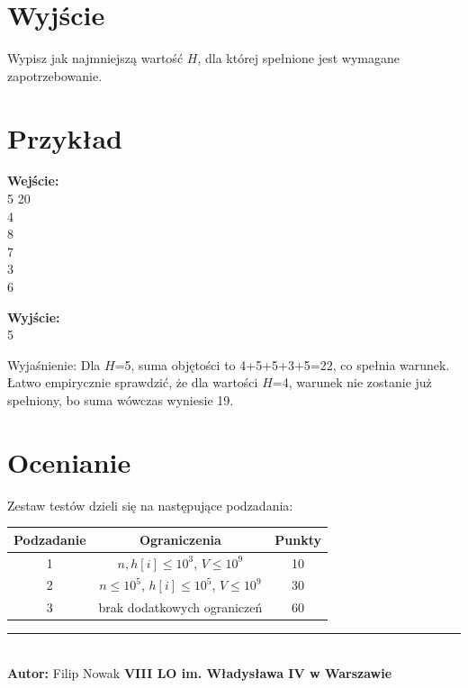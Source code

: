 \documentclass[a4paper,11pt]{article}
\newcommand{\tasktitle}{Dostawa Piwa}
\newcommand{\taskshort}{PIW}
\newcommand{\contestinfo}{Konkurs Świąteczny 2024 - Grupa Początkująca.}
\newcommand{\memorylimit}{256 MB}
\newcommand{\exampleinput}{5 20\\4\\8\\7\\3\\6}
\newcommand{\exampleoutput}{5}
\newcommand{\explanation}{Dla $H$=5, suma objętości to 4+5+5+3+5=22, co spełnia warunek. Łatwo empirycznie sprawdzić, że dla wartości $H$=4, warunek nie zostanie już spełniony, bo suma wówczas wyniesie 19.}
\newcommand{\subtasktable}{%
\begin{tabular}{|c|c|c|}
\hline
Podzadanie & Ograniczenia & Punkty \\
\hline
1 & $n, h[i] \leq 10^3$, $V \leq 10^9$ & 10 \\
2 & $n \leq 10^5$,  $h[i] \leq 10^5$, $V \leq 10^9$ & 30 \\
3 & brak dodatkowych ograniczeń & 60 \\
\hline
\end{tabular}}
\begin{document}
\section*{Wyjście}
Wypisz jak najmniejszą wartość $H$, dla której spełnione jest wymagane zapotrzebowanie.
\newpage
\section*{Przykład}
\begin{multicols}{2}
\noindent\textbf{Wejście:} \\
\exampleinput

\columnbreak

\noindent\textbf{Wyjście:} \\
\exampleoutput
\end{multicols}

\noindent Wyjaśnienie: \explanation

\section*{Ocenianie}
Zestaw testów dzieli się na następujące podzadania:
\begin{center}
\subtasktable
\end{center}

\vspace*{\fill}
\noindent\rule{\textwidth}{0.4pt} \\
\small \textbf{Autor:} Filip Nowak \hfill \textbf{VIII LO im. Władysława IV w Warszawie}

\end{document}
